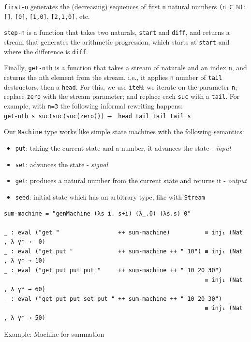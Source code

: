 \verb$first-n$ generates the (decreasing) sequences of first \verb$n$ natural numbers \verb$(n ∈ ℕ)$: \verb$[]$, \verb$[0]$, \verb$[1,0]$, \verb$[2,1,0]$, etc.

\verb$step-n$ is a function that takes two naturals, \verb$start$ and \verb$diff$, and returns a stream that generates the arithmetic progression, which starts at \verb$start$ and where the difference is \verb$diff$.

Finally, \verb$get-nth$ is a function that takes a stream of naturals and an index \verb$n$, and returns the nth element from the stream, i.e., it applies \verb$n$ number of \verb$tail$ destructors, then a \verb$head$. For this, we use \verb$iteℕ$: we iterate on the parameter \verb$n$; replace \verb$zero$ with the stream parameter; and replace each \verb$suc$ with a \verb$tail$. For example, with \verb$n=3$ the following informal rewriting happens:\\
\verb$get-nth s suc(suc(suc(zero))) ⟶  head tail tail tail s$

Our \verb$Machine$ type works like simple state machines with the following semantics:

\begin{itemize}
	\item{\verb$put$: taking the current state and a number, it advances the state - \textit{input}}
	\item{\verb$set$: advances the state - \textit{signal}}
	\item{\verb$get$: produces a natural number from the current state and returns it - \textit{output}}
	\item{\verb$seed$: initial state which has an arbitrary type, like with \verb$Stream$}
\end{itemize}

\begin{listing}[H]
\begin{verbatim}
sum-machine = "genMachine (λs i. s+i) (λ_.0) (λs.s) 0"

_ : eval ("get "                 ++ sum-machine)          ≡ inj₁ (Nat , λ γ* →  0)
_ : eval ("get put "             ++ sum-machine ++ " 10") ≡ inj₁ (Nat , λ γ* → 10)
_ : eval ("get put put put "     ++ sum-machine ++ " 10 20 30")
                                                          ≡ inj₁ (Nat , λ γ* → 60)
_ : eval ("get put put set put " ++ sum-machine ++ " 10 20 30")
                                                          ≡ inj₁ (Nat , λ γ* → 50)
\end{verbatim}
\caption{Example: Machine for summation}
\label{code:examples-machines-1}
\end{listing}

